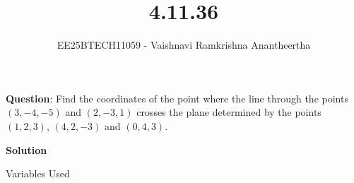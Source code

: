 \documentclass[journal]{IEEEtran}
\title{4.11.36}
\author{EE25BTECH11059 - Vaishnavi Ramkrishna Anantheertha}
\begin{document}
\maketitle

\renewcommand{\thefigure}{\theenumi}
\renewcommand{\thetable}{\theenumi}


\textbf{Question}:
Find the coordinates of the point where the line through the points $(3, -4, -5)$ and $(2, -3, 1)$ crosses the plane determined by the points $(1, 2, 3)$, $(4, 2, -3)$ and $(0, 4, 3)$.

\textbf{Solution }
\begin{table}[H]    
  \centering
  
  \caption{Variables Used}
  \label{tab:4.7.56}
\end{table}
\end{document}
